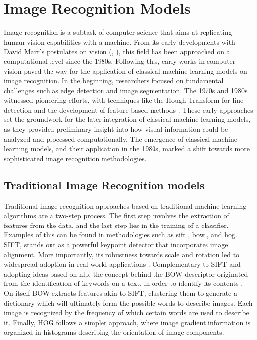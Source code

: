 \section{Image Recognition Models}
\label{rel:sec_imrecon}
Image recognition is a subtask of computer science that aims at replicating human vision 
capabilities with a machine. From its early developments  with David Marr's postulates 
on vision (\cite{poggio1981marr}, \cite{marr2010vision}), this field has been approached on a 
computational level since the 1980s. Following this, early works in computer vision 
paved the way for the application of classical machine learning models on image recognition. In 
the beginning, researchers focused on fundamental challenges such as edge detection and image 
segmentation. The 1970s and 1980s witnessed pioneering efforts, with 
techniques like the Hough Transform for line detection and the development of feature-based 
methods \autocite{duda1972use}. These early approaches set the groundwork for the later integration 
of classical machine learning models, as they provided preliminary insight into how visual 
information could be analyzed and processed computationally. The emergence of classical machine 
learning models, and their application in the 1980s, marked a shift towards more sophisticated 
image recognition methodologies.\\

\subsection{Traditional Image Recognition models}
\noindent Traditional image recognition approaches based on traditional machine learning 
algorithms are a two-step process. The first step involves the extraction of features from the 
data, and the last step lies in the training of a classifier. Examples of this 
can be found in methodologies such as \gls{sift} \autocite{lowe1999object}, \gls{bow} 
\autocite{csurka2004visual}, and \gls{hog}. 
SIFT, stands out as a powerful keypoint detector that incorporates image alignment. 
More importantly, its robustness towards scale and rotation led to widespread adoption in real 
world applications \autocite{cruz2012scale}.
Complementary to SIFT and adopting ideas based on \gls{nlp}, the concept behind the BOW descriptor 
originated from the identification of keywords on a text, in order to identify its contents 
\autocite{harris1954distributional}. On itself BOW extracts features akin to SIFT, clustering them 
to generate a dictionary which will ultimately form the possible words to describe images. Each 
image is recognized by the frequency of which certain words are used to describe it.
Finally, HOG follows a simpler approach, where image gradient information is organized in histograms 
describing the orientation of image components. \\ 

